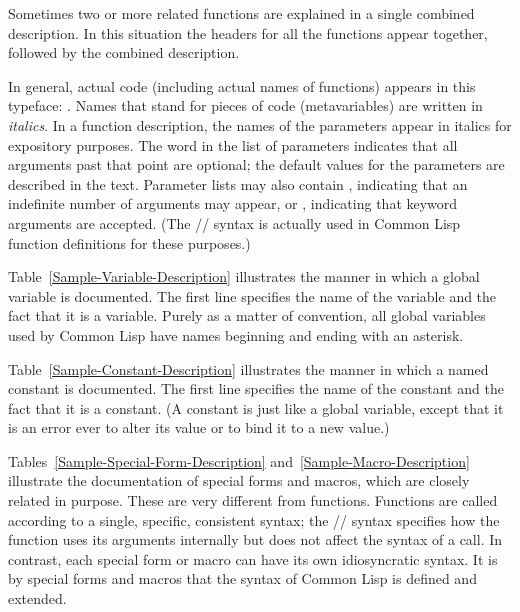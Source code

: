 Sometimes two or more related functions are explained in a single
combined description.  In this situation the headers for all the
functions appear together, followed by the combined description.

In general, actual code (including actual names of functions)
appears in this typeface: .
Names that stand for pieces of code (metavariables) are written in
\emph{italics}.  In a function description, the names of the parameters appear
in italics for expository purposes.  The word  in the
list of parameters indicates that all arguments past that point are
optional; the default values for the parameters are described in the
text.  Parameter lists may also contain , indicating that an
indefinite number of arguments may appear, or , indicating
that keyword arguments are accepted.
(The //
syntax is actually used in Common Lisp function definitions for these purposes.)

Table~\ref{Sample-Variable-Description} illustrates the manner in
which a global variable is documented.  The first line specifies the
name of the variable and the fact that it is a variable.
Purely as a matter of convention, all global variables used
by Common Lisp have names beginning and ending with an asterisk.

Table~\ref{Sample-Constant-Description} illustrates the manner in
which a named constant is documented.  The first line specifies the
name of the constant and the fact that it is a constant.
(A constant is just like a global variable, except that it is
an error ever to alter its value or to bind it to a new value.)

Tables~\ref{Sample-Special-Form-Description}
and~\ref{Sample-Macro-Description} illustrate the documentation
of special forms and macros, which are closely related in purpose.
These are very different from functions.
Functions are called according to a single, specific, consistent syntax;
the // syntax specifies how the function uses its arguments
internally but does not affect the syntax of a call.
In contrast, each special form or macro can have its own idiosyncratic syntax.
It is by special forms and macros that the syntax of Common Lisp is defined
and extended.

